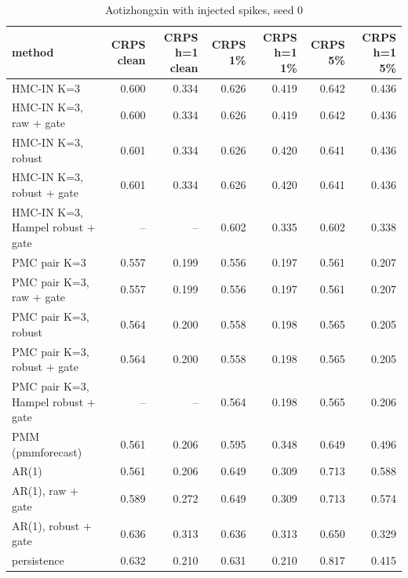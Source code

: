 \begin{table}[ht]\centering\small
\caption{Aotizhongxin with injected spikes, seed 0}
\begin{tabular}{lrrrrrr}
\hline
method & CRPS clean & CRPS h=1 clean & CRPS 1\% & CRPS h=1 1\% & CRPS 5\% & CRPS h=1 5\% \\ \hline
HMC-IN K=3 & 0.600 & 0.334 & 0.626 & 0.419 & 0.642 & 0.436 \\
HMC-IN K=3, raw + gate & 0.600 & 0.334 & 0.626 & 0.419 & 0.642 & 0.436 \\
HMC-IN K=3, robust & 0.601 & 0.334 & 0.626 & 0.420 & 0.641 & 0.436 \\
HMC-IN K=3, robust + gate & 0.601 & 0.334 & 0.626 & 0.420 & 0.641 & 0.436 \\
HMC-IN K=3, Hampel robust + gate & – & – & 0.602 & 0.335 & 0.602 & 0.338 \\
PMC pair K=3 & 0.557 & 0.199 & 0.556 & 0.197 & 0.561 & 0.207 \\
PMC pair K=3, raw + gate & 0.557 & 0.199 & 0.556 & 0.197 & 0.561 & 0.207 \\
PMC pair K=3, robust & 0.564 & 0.200 & 0.558 & 0.198 & 0.565 & 0.205 \\
PMC pair K=3, robust + gate & 0.564 & 0.200 & 0.558 & 0.198 & 0.565 & 0.205 \\
PMC pair K=3, Hampel robust + gate & – & – & 0.564 & 0.198 & 0.565 & 0.206 \\
PMM (pmmforecast) & 0.561 & 0.206 & 0.595 & 0.348 & 0.649 & 0.496 \\
AR(1) & 0.561 & 0.206 & 0.649 & 0.309 & 0.713 & 0.588 \\
AR(1), raw + gate & 0.589 & 0.272 & 0.649 & 0.309 & 0.713 & 0.574 \\
AR(1), robust + gate & 0.636 & 0.313 & 0.636 & 0.313 & 0.650 & 0.329 \\
persistence & 0.632 & 0.210 & 0.631 & 0.210 & 0.817 & 0.415 \\
\hline\end{tabular}\end{table}

